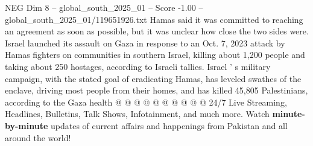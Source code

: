\begin{textsample}{NEG Dim 8 – global\_south\_2025\_01 – Score -1.00 – global\_south\_2025\_01/119651926.txt}
Hamas said it was committed to reaching an agreement as soon as possible, but it was unclear how close the two sides were.
Israel launched its assault on Gaza in response to an Oct. 7, 2023 attack by Hamas fighters on communities in southern Israel, killing about 1,200 people and taking about 250 hostages, according to Israeli tallies.
Israel ' s military campaign, with the stated goal of eradicating Hamas, has leveled swathes of the enclave, driving most people from their homes, and has killed 45,805 Palestinians, according to the Gaza health @ @ @ @ @ @ @ @ @ @ 24/7 Live Streaming, Headlines, Bulletins, Talk Shows, Infotainment, and much more.
Watch \textbf{minute-by-minute} updates of current affairs and happenings from Pakistan and all around the world!

\end{textsample}

